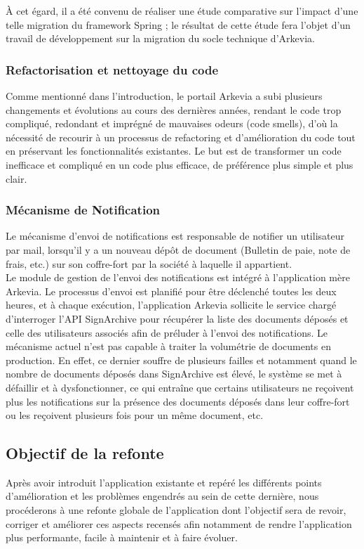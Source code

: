 À cet égard, il a été convenu de réaliser une étude comparative sur l'impact d'une telle migration du framework Spring ; le résultat de cette étude fera l'objet d'un travail de développement sur la migration du socle technique d'Arkevia.

\subsubsection{Refactorisation et nettoyage du code}
Comme mentionné dans l'introduction, le portail Arkevia a subi plusieurs changements et évolutions au cours des dernières années, rendant le code trop compliqué, redondant et imprégné de mauvaises odeurs (code smells), d'où la nécessité de recourir à un processus de refactoring et d'amélioration du code tout en préservant les fonctionnalités existantes. Le but est de transformer un code inefficace et compliqué en un code plus efficace, de préférence plus simple et plus clair.
\subsubsection{Mécanisme de Notification}
Le mécanisme d'envoi de notifications est responsable de notifier un utilisateur par mail, lorsqu'il y a un nouveau dépôt de document (Bulletin de paie, note de frais, etc.) sur son coffre-fort par la société à laquelle il appartient.\\

Le module de gestion de l'envoi des notifications est intégré à l'application mère Arkevia. Le processus d'envoi est planifié pour être déclenché toutes les deux heures, et à chaque exécution, l'application Arkevia sollicite le service chargé d'interroger l'API SignArchive pour récupérer la liste des documents déposés et celle des utilisateurs associés afin de préluder à l'envoi des notifications.
Le mécanisme actuel n'est pas capable à traiter la volumétrie de documents en production. En effet, ce dernier souffre de plusieurs failles et notamment quand le nombre de documents déposés dans SignArchive est élevé, le système se met à défaillir et à dysfonctionner, ce qui entraîne que certains utilisateurs ne reçoivent plus les notifications sur la présence des documents déposés dans leur coffre-fort ou les reçoivent plusieurs fois pour un même document, etc. 

\subsection{Objectif de la refonte}
Après avoir introduit l'application existante et repéré les différents points d'amélioration et les problèmes engendrés au sein de cette dernière, nous procéderons à une refonte globale de l'application dont l'objectif sera de revoir, corriger et améliorer ces aspects recensés afin notamment de rendre l'application plus performante, facile à maintenir et à faire évoluer.


